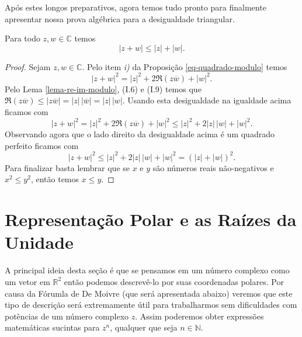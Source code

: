 Após estes longos preparativos, agora temos tudo pronto para finalmente apresentar nossa prova 
algébrica para a desigualdade triangular.
\begin{teorema}
\label{teo-des-triang}
Para todo $z,w\in\mathbb{C}$ temos 
\[|z+w|\leqslant |z|+|w|.\]
\end{teorema}
\begin{proof}
Sejam $z,w\in\mathbb{C}$. Pelo item \textit{i)} da Proposição \ref{eq-quadrado-modulo} 
temos
\[
|z+w|^2 = |z|^2+2\Re(z\overline{w})+|w|^2.
\]
Pelo Lema \ref{lema-re-im-modulo}, (I.6) e (I.9) 
temos que $\Re(z\overline{w})\leq |z\overline{w}| = |z|\, |\overline{w}|=|z|\,|w|$.
Usando esta desigualdade na igualdade acima ficamos com 
\[
|z+w|^2 = |z|^2+2\Re(z\overline{w})+|w|^2\leq |z|^2+2|z|\,|w|+|w|^2.
\]
Observando agora que o lado direito da desigualdade acima é um quadrado perfeito ficamos
com
\[
|z+w|^2
\leq 
|z|^2+2|z|\,|w|+|w|^2
=(|z|+|w|)^2.
\]
Para finalizar basta
lembrar que se $x$ e $y$ são números reais não-negativos e $x^2\leq y^2$, então temos $x\leq y$.
\end{proof}




\section[Representação Polar e as Raízes $n$-ésimas da Unidade]{Representação Polar e as Raízes da Unidade}

A principal ideia desta seção é que se pensamos em um número complexo como um vetor em $\mathbb{R}^2$
então podemos descrevê-lo por suas coordenadas polares. 
Por causa da Fórumla de De Moivre (que será apresentada abaixo) 
veremos que este tipo de descrição será extremamente útil para trabalharmos sem dificuldades 
com potências de um número complexo $z$. Assim poderemos obter expressões matemáticas
sucintas para $z^n$, qualquer que seja $n\in\mathbb{N}$. 

